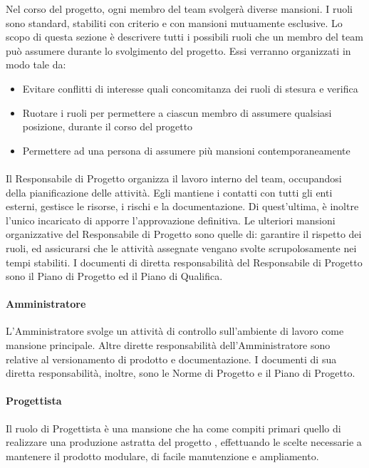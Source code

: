 Nel corso del progetto, ogni membro del team svolgerà diverse mansioni. I ruoli sono standard, stabiliti con criterio e con mansioni mutuamente esclusive. Lo scopo di questa sezione è descrivere tutti i possibili ruoli che un membro del team può assumere durante lo svolgimento del progetto. Essi verranno organizzati in modo tale da:
\begin{itemize}
	\item Evitare conflitti di interesse quali concomitanza dei ruoli di stesura e verifica
	\item Ruotare i ruoli per permettere a ciascun membro di assumere qualsiasi posizione, durante il corso del progetto
	\item Permettere ad una persona di assumere più mansioni contemporaneamente
\end{itemize}

\paragraph{\RdP}
Il Responsabile di Progetto organizza il lavoro interno del team, occupandosi della pianificazione delle attività. Egli mantiene i contatti con tutti gli enti esterni, gestisce le risorse, i rischi e la documentazione. Di quest'ultima, è inoltre l'unico incaricato di apporre l'approvazione definitiva. Le ulteriori mansioni organizzative del Responsabile di Progetto sono quelle di: garantire il rispetto dei ruoli, ed assicurarsi che le attività assegnate vengano svolte scrupolosamente nei tempi stabiliti. I documenti di diretta responsabilità del Responsabile di Progetto sono il Piano di Progetto ed il Piano di Qualifica.

\paragraph{Amministratore}
L'Amministratore svolge un attività di controllo sull'ambiente di lavoro come mansione principale. Altre dirette responsabilità dell'Amministratore sono relative al versionamento di prodotto e documentazione. I documenti di sua diretta responsabilità, inoltre, sono le Norme di Progetto e il Piano di Progetto.

\paragraph{Progettista}
Il ruolo di Progettista è una mansione che ha come compiti primari quello di realizzare una produzione astratta del progetto , effettuando le scelte necessarie a mantenere il prodotto modulare, di facile manutenzione e ampliamento.

